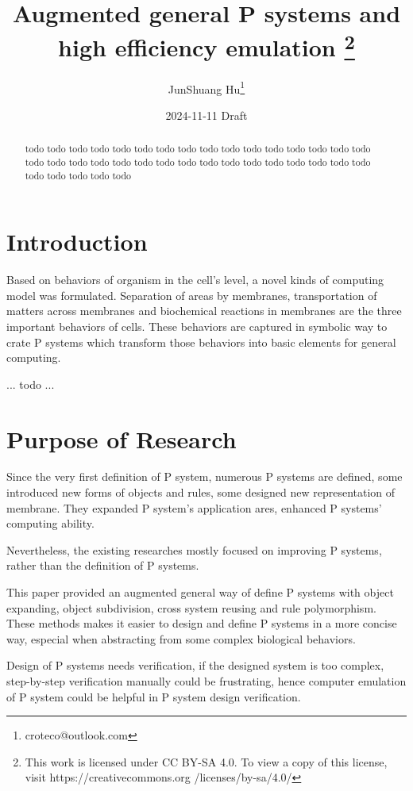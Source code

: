 \documentclass[9pt,a4paper,twoside]{article}
\title{
    Augmented general P systems and high efficiency emulation
    \footnote{
        This work is licensed under CC BY-SA 4.0. To view a copy of this license, visit 
        https://creativecommons.org /licenses/by-sa/4.0/
    }
}
\date{2024-11-11 Draft}
\author{JunShuang Hu\footnote{croteco@outlook.com}}
\begin{document}
    \maketitle

\begin{abstract}
    todo todo todo todo todo todo todo todo todo todo todo todo todo todo todo todo todo todo todo todo todo todo todo todo todo todo todo todo todo todo todo todo todo todo todo todo todo 
\end{abstract}

\section{Introduction}

    Based on behaviors of organism in the cell's level, a novel kinds of computing model was formulated. Separation of areas by membranes,
    transportation of matters across membranes and biochemical reactions in membranes are the three important behaviors of cells. 
    These behaviors are captured in symbolic way to crate P systems which transform those behaviors into basic elements for general computing.

    ...  
    todo
    ...  

\section{Purpose of Research}
    Since the very first definition of P system, numerous P systems are defined, some introduced new forms of objects and rules, 
    some designed new representation of membrane. They expanded P system's application ares, enhanced P systems' computing ability.

    Nevertheless, the existing researches mostly focused on improving P systems, rather than the definition of P systems.

    This paper provided an augmented general way of define P systems with object expanding, object subdivision, cross system 
    reusing and rule polymorphism. These methods makes it easier to design and define P systems in a more concise way, especial 
    when abstracting from some complex biological behaviors. 
    
    Design of P systems needs verification, if the designed system is too complex, step-by-step verification manually could be 
    frustrating, hence computer emulation of P system could be helpful in P system design verification. 
\end{document}
